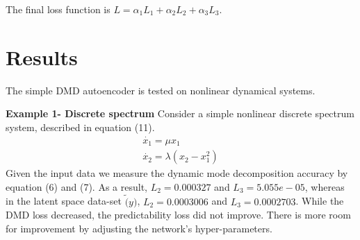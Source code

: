 \documentclass[twocolumn, letterpaper]{scrartcl}
\begin{document}
The final loss function is $L = \alpha_{1}L_{1} + \alpha_{2}L_{2} + \alpha_{3}L_{3}$. 




\section*{\fontsize{15}{15} \textbf{Results}}
    The simple DMD autoencoder is tested on nonlinear dynamical systems. 
    
    \textbf{Example 1- Discrete spectrum}
    Consider a simple nonlinear discrete spectrum system, described in equation (11).  
    \begin{equation} \label{eq:11}
        \begin{array}{l}
            \dot{x_{1}} = \mu x_{1} \\
            \dot{x_{2}} = \lambda (x_{2} - x_{1}^{2})
        \end{array}
    \end{equation}
    Given the input data we measure the dynamic mode decomposition accuracy by equation (6) and (7). As a result, $L_{2} =  0.000327$ and $L_{3} = 5.055e-05$, whereas in the latent space data-set $\tilde(y)$, $L_{2} =  0.0003006$ and $L_{3} = 0.0002703$. While the DMD loss decreased, the predictability loss did not improve. There is more room for improvement by adjusting the network's hyper-parameters. 
\end{document}
